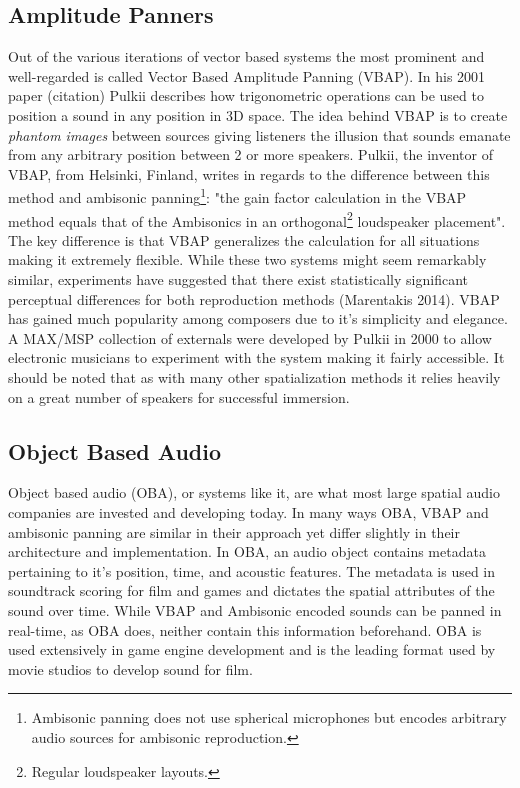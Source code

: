 \subsection{Amplitude Panners}
\label{subsec:amplitude panner}


Out of the various iterations of vector based systems the most prominent and well-regarded is called Vector Based Amplitude Panning (VBAP). In his 2001 paper (citation) Pulkii describes how trigonometric operations can be used to position a sound in any position in 3D space. The idea behind VBAP is to create \textit{phantom images} between sources giving listeners the illusion that sounds emanate from any arbitrary position between 2 or more speakers. Pulkii, the inventor of VBAP, from Helsinki, Finland, writes in regards to the difference between this method and ambisonic panning\footnote{Ambisonic panning does not use spherical microphones but encodes arbitrary audio sources for ambisonic reproduction.}: "the gain factor calculation in the VBAP method equals that of the Ambisonics in an orthogonal\footnote{Regular loudspeaker layouts.} loudspeaker placement". The key difference is that VBAP generalizes the calculation for all situations making it extremely flexible. While these two systems might seem remarkably similar, experiments have suggested that there exist statistically significant perceptual differences for both reproduction methods (Marentakis 2014). VBAP has gained much popularity among composers due to it's simplicity and elegance. A MAX/MSP collection of externals were developed by Pulkii in 2000 to allow electronic musicians to experiment with the system making it fairly accessible. It should be noted that as with many other spatialization methods it relies heavily on a great number of speakers for successful immersion. 

\subsection{Object Based Audio}
\label{subsec:oba}

Object based audio (OBA), or systems like it, are what most large spatial audio companies are invested and developing today. In many ways OBA, VBAP and ambisonic panning are similar in their approach yet differ slightly in their architecture and implementation. In OBA, an audio object contains metadata pertaining to it's position, time, and acoustic features. The metadata is used in soundtrack scoring for film and games and dictates the spatial attributes of the sound over time. While VBAP and Ambisonic encoded sounds can be panned in real-time, as OBA does, neither contain this information beforehand. OBA is used extensively in game engine development and is the leading format used by movie studios to develop sound for film. 

